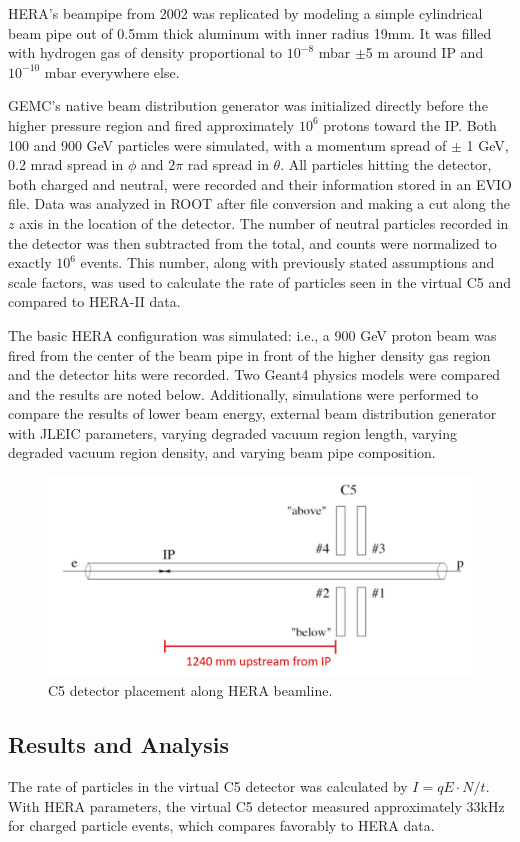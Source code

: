 HERA's beampipe from 2002 was replicated by modeling a simple cylindrical beam pipe out of 0.5mm thick aluminum with inner radius 19mm.  It was filled with hydrogen gas of density proportional to  $10^{-8}$ mbar $\pm$5 m around IP and $10^{-10}$ mbar everywhere else.

GEMC's native beam distribution generator was initialized directly before the higher pressure region and fired approximately $10^6$ protons toward the IP.  Both 100 and 900 GeV particles were simulated, with a momentum spread of $\pm$ 1 GeV, 0.2 mrad spread in $\phi$ and $2\pi$ rad spread in $\theta$.  All particles hitting the detector, both charged and neutral, were recorded and their information stored in an EVIO file.  Data was analyzed in ROOT after file conversion and making a cut along the $z$ axis in the location of the detector.  The number of neutral particles recorded in the detector was then subtracted from the total, and counts were normalized to exactly $10^6$ events.  This number, along with previously stated assumptions and scale factors, was used to calculate the rate of particles seen in the virtual C5 and compared to HERA-II data.

The basic HERA configuration was simulated: i.e., a 900 GeV proton beam was fired from the center of the beam pipe in front of the higher density gas region and the detector hits were recorded.  Two Geant4 physics models were compared and the results are noted below.  Additionally, simulations were performed to compare the results of lower beam energy, external beam distribution generator with JLEIC parameters, varying degraded vacuum region length, varying degraded vacuum region density, and varying beam pipe composition.

\begin{figure}
	\centering
	\includegraphics[width=.75\textwidth]{../../img/c5_placement.jpg}
	\caption{C5 detector placement along HERA beamline.}
	\label{fig:hera4}
\end{figure}

\subsection{Results and Analysis}
The rate of particles in the virtual C5 detector was calculated by $I = qE\cdot N/t$.  With HERA parameters, the virtual C5 detector measured approximately 33kHz for charged particle events, which compares favorably to HERA data.  

